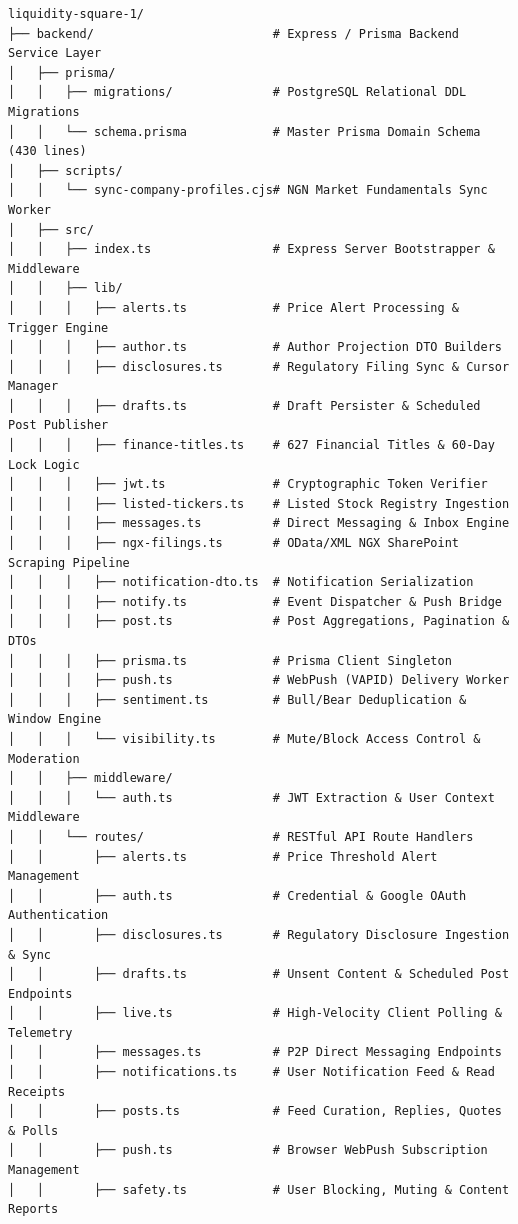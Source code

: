 \documentclass[11pt,a4paper]{article}
\begin{document}
\begin{verbatim}
liquidity-square-1/
├── backend/                         # Express / Prisma Backend Service Layer
│   ├── prisma/
│   │   ├── migrations/              # PostgreSQL Relational DDL Migrations
│   │   └── schema.prisma            # Master Prisma Domain Schema (430 lines)
│   ├── scripts/
│   │   └── sync-company-profiles.cjs# NGN Market Fundamentals Sync Worker
│   ├── src/
│   │   ├── index.ts                 # Express Server Bootstrapper & Middleware
│   │   ├── lib/
│   │   │   ├── alerts.ts            # Price Alert Processing & Trigger Engine
│   │   │   ├── author.ts            # Author Projection DTO Builders
│   │   │   ├── disclosures.ts       # Regulatory Filing Sync & Cursor Manager
│   │   │   ├── drafts.ts            # Draft Persister & Scheduled Post Publisher
│   │   │   ├── finance-titles.ts    # 627 Financial Titles & 60-Day Lock Logic
│   │   │   ├── jwt.ts               # Cryptographic Token Verifier
│   │   │   ├── listed-tickers.ts    # Listed Stock Registry Ingestion
│   │   │   ├── messages.ts          # Direct Messaging & Inbox Engine
│   │   │   ├── ngx-filings.ts       # OData/XML NGX SharePoint Scraping Pipeline
│   │   │   ├── notification-dto.ts  # Notification Serialization
│   │   │   ├── notify.ts            # Event Dispatcher & Push Bridge
│   │   │   ├── post.ts              # Post Aggregations, Pagination & DTOs
│   │   │   ├── prisma.ts            # Prisma Client Singleton
│   │   │   ├── push.ts              # WebPush (VAPID) Delivery Worker
│   │   │   ├── sentiment.ts         # Bull/Bear Deduplication & Window Engine
│   │   │   └── visibility.ts        # Mute/Block Access Control & Moderation
│   │   ├── middleware/
│   │   │   └── auth.ts              # JWT Extraction & User Context Middleware
│   │   └── routes/                  # RESTful API Route Handlers
│   │       ├── alerts.ts            # Price Threshold Alert Management
│   │       ├── auth.ts              # Credential & Google OAuth Authentication
│   │       ├── disclosures.ts       # Regulatory Disclosure Ingestion & Sync
│   │       ├── drafts.ts            # Unsent Content & Scheduled Post Endpoints
│   │       ├── live.ts              # High-Velocity Client Polling & Telemetry
│   │       ├── messages.ts          # P2P Direct Messaging Endpoints
│   │       ├── notifications.ts     # User Notification Feed & Read Receipts
│   │       ├── posts.ts             # Feed Curation, Replies, Quotes & Polls
│   │       ├── push.ts              # Browser WebPush Subscription Management
│   │       ├── safety.ts            # User Blocking, Muting & Content Reports

\end{verbatim}
\end{document}
